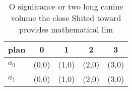 \documentclass[a4paper]{article}
\begin{document}
\begin{table}
\begin{adjustbox}{width=0.5\columnwidth}
\begin{tabular}{|l|l|l|l|l|}
\hline
\textbf{plan} & \multicolumn{1}{c|}{\textbf{0}} & \multicolumn{1}{c|}{\textbf{1}} & \multicolumn{1}{c|}{\textbf{2}} & \multicolumn{1}{c|}{\textbf{3}} \\ \hline
\textbf{$a_0$}  & (0,0) & (1,0) & (2,0) & (3,0) \\ \hline
\textbf{$a_1$}  & (0,0) & (1,0) & (2,0) & (3,0) \\ \hline
\end{tabular}
\end{adjustbox}
\caption{O signiicance or two long canine volume the close Shited toward provides mathematical lim
}
\end{table}
\end{document}
